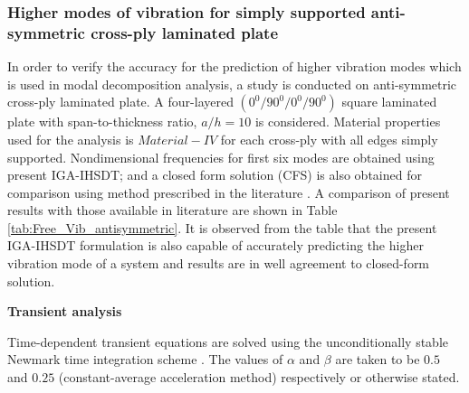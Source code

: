 \documentclass[3p,preprint,12pt]{elsarticle}
\begin{document}
\subsubsection{Higher modes of vibration for simply supported anti-symmetric cross-ply laminated plate}
In order to verify the accuracy for the prediction of higher vibration modes which is used in modal decomposition analysis, a study is conducted on anti-symmetric cross-ply laminated plate. A four-layered $\left(0^{0}/90^{0}/0^{0}/90^{0}\right)$ square laminated plate with span-to-thickness ratio, $a/h=10$ is considered. Material properties used for the analysis is $Material-IV$ for each cross-ply with all edges simply supported. Nondimensional frequencies for first six modes are obtained using present IGA-IHSDT; and a closed form solution (CFS) is also obtained for comparison using method prescribed in the literature \cite{grover2013analytical}.  A comparison of present results with those available in literature are shown in Table \ref{tab:Free_Vib_antisymmetric}. It is observed from the table that the present IGA-IHSDT formulation is also capable of accurately predicting the higher vibration mode of a system and results are in well agreement to closed-form solution.     

\begin{table}
	\caption{\label{tab:Free_Vib_antisymmetric}First six natural frequencies of anti-symmetric laminated plate $\left(0^{0}/90^{0}/0^{0}/90^{0}\right)$ under simply supported boundary condition with $a/h=10$}
	\centering{}%
\end{table}
\begin{flushleft}
	\textbf{Transient analysis}
\end{flushleft}
Time-dependent transient equations are solved using the unconditionally stable Newmark time integration scheme \cite{krenk2009non}. The values of $\alpha$ and $\beta$ are taken to be $0.5$ and $0.25$ (constant-average acceleration method) respectively or otherwise stated.
\end{document}
